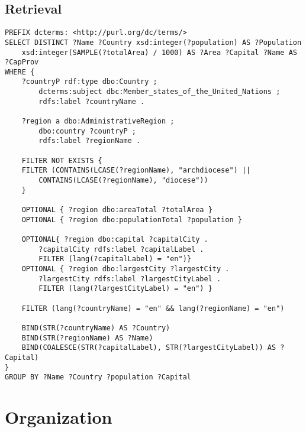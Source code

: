 \documentclass[11pt]{article}
\begin{document}
\subsection{Retrieval}
{\footnotesize\begin{verbatim}
PREFIX dcterms: <http://purl.org/dc/terms/>
SELECT DISTINCT ?Name ?Country xsd:integer(?population) AS ?Population 
    xsd:integer(SAMPLE(?totalArea) / 1000) AS ?Area ?Capital ?Name AS ?CapProv
WHERE {
    ?countryP rdf:type dbo:Country ;
        dcterms:subject dbc:Member_states_of_the_United_Nations ;
        rdfs:label ?countryName .

    ?region a dbo:AdministrativeRegion ;
        dbo:country ?countryP ;
        rdfs:label ?regionName .

    FILTER NOT EXISTS {
    FILTER (CONTAINS(LCASE(?regionName), "archdiocese") || 
        CONTAINS(LCASE(?regionName), "diocese"))
    }

    OPTIONAL { ?region dbo:areaTotal ?totalArea }
    OPTIONAL { ?region dbo:populationTotal ?population }

    OPTIONAL{ ?region dbo:capital ?capitalCity .
        ?capitalCity rdfs:label ?capitalLabel .
        FILTER (lang(?capitalLabel) = "en")}
    OPTIONAL { ?region dbo:largestCity ?largestCity .
        ?largestCity rdfs:label ?largestCityLabel .
        FILTER (lang(?largestCityLabel) = "en") }

    FILTER (lang(?countryName) = "en" && lang(?regionName) = "en")

    BIND(STR(?countryName) AS ?Country)
    BIND(STR(?regionName) AS ?Name)
    BIND(COALESCE(STR(?capitalLabel), STR(?largestCityLabel)) AS ?Capital)
}
GROUP BY ?Name ?Country ?population ?Capital
\end{verbatim}}

\section{Organization}
\end{document}
